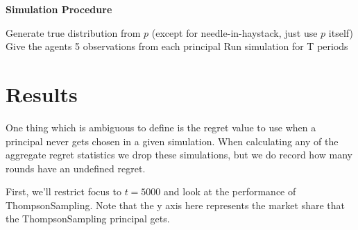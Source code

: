 \documentclass[11pt,letterpaper]{article}
\begin{document}
\pagebreak
\textbf{Simulation Procedure}
\begin{algorithm}
\begin{algorithmic}[1]
				\State Generate true distribution from $p$ (except for needle-in-haystack, just use $p$ itself)
				\State Give the agents 5 observations from each principal
				\State Run simulation for T periods
			\EndFor
		\EndFor
	\EndFor
\EndFor
\end{algorithmic}
\end{algorithm}

\pagebreak
\section*{Results}

One thing which is ambiguous to define is the regret value to use when a principal never gets chosen in a given simulation. When calculating any of the aggregate regret statistics we drop these simulations, but we do record how many rounds have an undefined regret. \\
\vspace{0.5cm}

First, we'll restrict focus to $t = 5000$ and look at the performance of ThompsonSampling. Note that the y axis here represents the market share that the ThompsonSampling principal gets. \\
\vspace{0.5cm}
\end{document}

